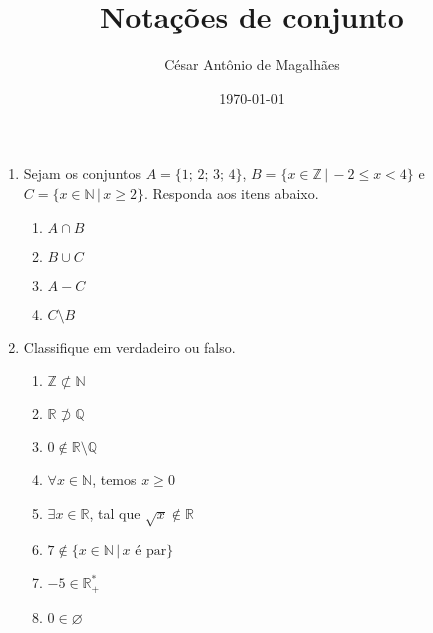 \documentclass[12pt,a4paper]{article}
\title{Notações de conjunto}
\author{César Antônio de Magalhães}
\date{\today}
\begin{document}
	\begin{enumerate}
		\item Sejam os conjuntos $A = \{1;\, 2;\, 3;\, 4\}$,
		$B = \{x \in \mathbb{Z} \,|\, -2 \leq x < 4\}$ e
		$C = \{x \in \mathbb{N} \,|\, x \geq 2\}$. Responda aos itens abaixo.
		\begin{enumerate}
			\item $A \cap B$
			\item $B \cup C$
			\item $A - C$
			\item $C \setminus B$
		\end{enumerate}
		
		\item Classifique em verdadeiro ou falso.
		\begin{enumerate}
			\item $\mathbb{Z} \not\subset \mathbb{N}$
			\item $\mathbb{R} \not\supset \mathbb{Q}$
			\item $0 \not\in \mathbb{R} \setminus\mathbb{Q}$
			\item $\forall x \in \mathbb{N}$, temos $x \geq 0$
			\item $\exists x \in \mathbb{R}$, tal que $\sqrt{x} \not\in \mathbb{R}$
			\item $7 \not\in \{x \in \mathbb{N} \,|\, x\textrm{ é par}\}$
			\item $-5 \in \mathbb{R}^*_+$
			\item $0 \in \varnothing$
		\end{enumerate}
	\end{enumerate}		
\end{document}

